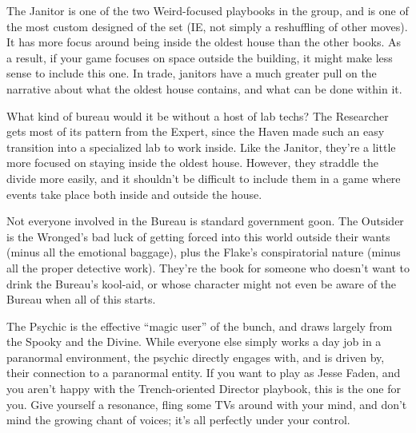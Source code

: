 \documentclass[10pt,oneside,landscape]{memoir}
\begin{document}
\begin{multicols}{3}
{The Janitor is one of the two Weird-focused playbooks in the group, and is one of the most custom designed of the set (IE, not simply a reshuffling of other moves).  It has more focus around being inside the oldest house than the other books.  As a result, if your game focuses on space outside the building, it might make less sense to include this one.  In trade, janitors have a much greater pull on the narrative about what the oldest house contains, and what can be done within it.}

{What kind of bureau would it be without a host of lab techs?  The Researcher gets most of its pattern from the Expert, since the Haven made such an easy transition into a specialized lab to work inside.  Like the Janitor, they’re a little more focused on staying inside the oldest house.  However, they straddle the divide more easily, and it shouldn’t be difficult to include them in a game where events take place both inside and outside the house.}

{Not everyone involved in the Bureau is standard government goon.  The Outsider is the Wronged’s bad luck of getting forced into this world outside their wants (minus all the emotional baggage), plus the Flake’s conspiratorial nature (minus all the proper detective work).  They’re the book for someone who doesn’t want to drink the Bureau’s kool-aid, or whose character might not even be aware of the Bureau when all of this starts.}

{The Psychic is the effective “magic user” of the bunch, and draws largely from the Spooky and the Divine.  While everyone else simply works a day job in a paranormal environment, the psychic directly engages with, and is driven by, their connection to a paranormal entity.  If you want to play as Jesse Faden, and you aren’t happy with the Trench-oriented Director playbook, this is the one for you.  Give yourself a resonance, fling some TVs around with your mind, and don’t mind the growing chant of voices; it’s all perfectly under your control.}

\end{multicols}
\pagebreak

\fontsize{10}{12}\selectfont


\pagebreak


\pagebreak
\end{document}
